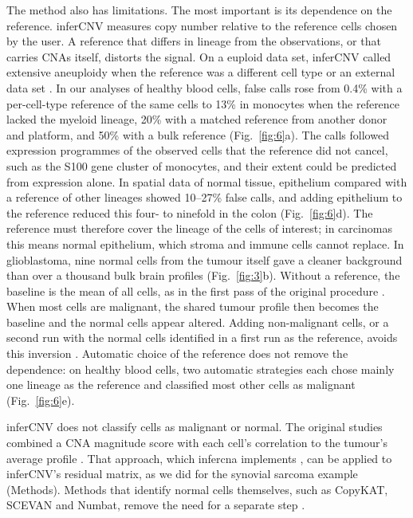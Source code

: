 The method also has limitations. The most important is its dependence on the reference. inferCNV measures copy number relative to the reference cells chosen by the user. A reference that differs in lineage from the observations, or that carries CNAs itself, distorts the signal. On a euploid data set, inferCNV called extensive aneuploidy when the reference was a different cell type or an external data set \citep{schmid2025}. In our analyses of healthy blood cells, false calls rose from 0.4\% with a per-cell-type reference of the same cells to 13\% in monocytes when the reference lacked the myeloid lineage, 20\% with a matched reference from another donor and platform, and 50\% with a bulk reference (Fig.~\ref{fig:6}a). The calls followed expression programmes of the observed cells that the reference did not cancel, such as the S100 gene cluster of monocytes, and their extent could be predicted from expression alone. In spatial data of normal tissue, epithelium compared with a reference of other lineages showed 10--27\% false calls, and adding epithelium to the reference reduced this four- to ninefold in the colon (Fig.~\ref{fig:6}d). The reference must therefore cover the lineage of the cells of interest; in carcinomas this means normal epithelium, which stroma and immune cells cannot replace. In glioblastoma, nine normal cells from the tumour itself gave a cleaner background than over a thousand bulk brain profiles (Fig.~\ref{fig:3}b). Without a reference, the baseline is the mean of all cells, as in the first pass of the original procedure \citep{puram2017}. When most cells are malignant, the shared tumour profile then becomes the baseline and the normal cells appear altered. Adding non-malignant cells, or a second run with the normal cells identified in a first run as the reference, avoids this inversion \citep{song2025}. Automatic choice of the reference does not remove the dependence: on healthy blood cells, two automatic strategies each chose mainly one lineage as the reference and classified most other cells as malignant (Fig.~\ref{fig:6}e).

inferCNV does not classify cells as malignant or normal. The original studies combined a CNA magnitude score with each cell's correlation to the tumour's average profile \citep{venteicher2017, puram2017, neftel2019}. That approach, which infercna implements \citep{laffy_infercna}, can be applied to inferCNV's residual matrix, as we did for the synovial sarcoma example (Methods). Methods that identify normal cells themselves, such as CopyKAT, SCEVAN and Numbat, remove the need for a separate step \citep{gao2021copykat, defalco2023, gao2023numbat}.

